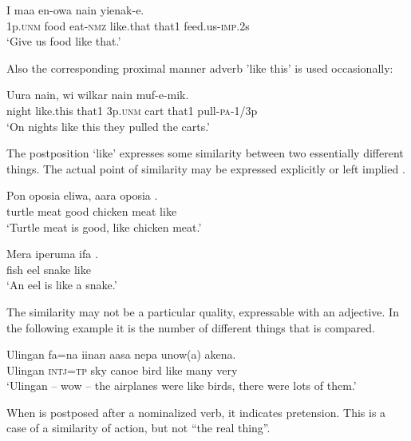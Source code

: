 \ea%
\label{ex:6:x1348}
\gll I  maa  en-owa    nain  yienak-e. \\
1p.\textsc{unm}  food  eat-\textsc{nmz}  like.that  that1  feed.us-\textsc{imp}.2s\\
\glt `Give us food like that.'
\z

Also the corresponding proximal manner adverb  'like this' is used occasionally:

\ea%
\label{ex:6:x1347}
\gll Uura    nain,  wi  wilkar  nain  muf-e-mik. \\
night  like.this  that1  3p.\textsc{unm}  cart  that1  pull-\textsc{pa}-1/3p\\
\glt `On nights like this they pulled the carts.'
\z

The postposition  `like' expresses some similarity between two essentially different things. The actual point of similarity may be expressed explicitly  or left implied .

\ea%
\label{ex:6:x1341}
\gll Pon  oposia  eliwa,  aara  oposia  . \\
turtle  meat  good  chicken  meat  like\\
\glt `Turtle meat is good, like chicken meat.'
\z

\ea%
\label{ex:6:x1340}
\gll Mera  iperuma  ifa  . \\
fish  eel  snake  like\\
\glt `An eel is like a snake.'
\z

The similarity may not be a particular quality, expressable with an adjective. In the following example it is the number of different things that is compared.

\ea%
\label{ex:6:x1342}
\gll Ulingan  fa=na  iinan  aasa  nepa    unow(a)  akena. \\
Ulingan  \textsc{intj}=\textsc{tp}  sky  canoe  bird  like  many  very\\
\glt `Ulingan -- wow -- the airplanes were like birds, there were lots of them.'
\z

When  is postposed after a nominalized verb, it indicates pretension. This is a case of a similarity of action, but not ``the real thing''.

